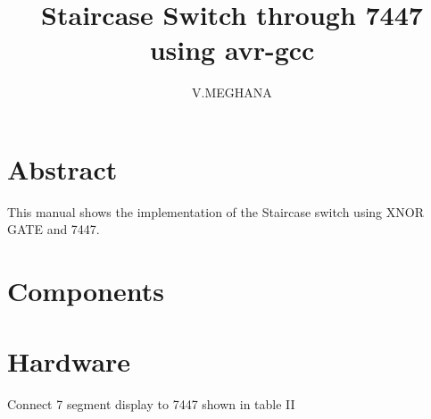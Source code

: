 \documentclass[journal,12pt,twocolumn]{IEEEtran}
\begin{document}
%

\theoremstyle{definition}
\newtheorem{theorem}{Theorem}[section]
\newtheorem{problem}{Problem}
\newtheorem{proposition}{Proposition}[section]
\newtheorem{lemma}{Lemma}[section]
\newtheorem{corollary}[theorem]{Corollary}
\newtheorem{example}{Example}[section]
\newtheorem{definition}{Definition}[section]
\newcommand{\BEQA}{\begin{eqnarray}}
\newcommand{\EEQA}{\end{eqnarray}}
\newcommand{\define}{\stackrel{\triangle}{=}}
\vspace{3cm}
\title{ 
Staircase Switch through 7447 using avr-gcc
}

\author{V.MEGHANA}


\maketitle
\tableofcontents
\bigskip
%
\section{Abstract}

This manual shows the implementation of the Staircase switch using XNOR GATE and 7447.
\section{\textbf{Components}}

\section{Hardware}

\begin{table}[!h]
\centering
%

\caption{}
\label{table:7447_disp}
\end{table}
Connect 7 segment display to 7447 shown in table II
\begin{table}[ht]
\centering
{}
\caption{}
\label{tab:first table}
\end{table}
\end{document}
